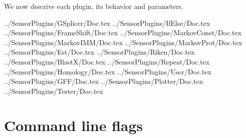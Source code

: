 \documentclass[a4paper,titlepage]{report}
\begin{document}
We now descrive each plugin, its behavior and parameters.











 {../SensorPlugins/GSplicer/Doc.tex}
 {../SensorPlugins/IfElse/Doc.tex}
 {../SensorPlugins/FrameShift/Doc.tex}
 {../SensorPlugins/MarkovConst/Doc.tex}
 {../SensorPlugins/MarkovIMM/Doc.tex}
 {../SensorPlugins/MarkovProt/Doc.tex}
 {../SensorPlugins/Est/Doc.tex}
 {../SensorPlugins/Riken/Doc.tex}
 {../SensorPlugins/BlastX/Doc.tex}
 {../SensorPlugins/Repeat/Doc.tex}
 {../SensorPlugins/Homology/Doc.tex}
 {../SensorPlugins/User/Doc.tex}
 {../SensorPlugins/GFF/Doc.tex}
 {../SensorPlugins/Plotter/Doc.tex}
 {../SensorPlugins/Tester/Doc.tex}

\section{Command line flags}
 
\end{document}
